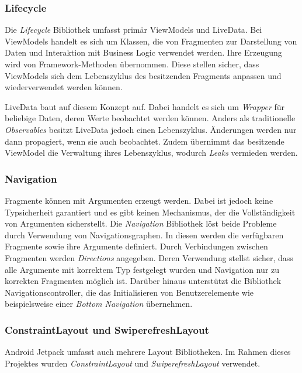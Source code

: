 \documentclass[a4paper, 11pt]{article}
\begin{document}
\subsubsection{Lifecycle}
\label{subsubsec:app:jetpack:lifecycle}
Die \textit{Lifecycle} Bibliothek umfasst primär ViewModels und LiveData.
Bei ViewModels handelt es sich um Klassen, die von Fragmenten zur Darstellung von Daten und Interaktion mit Business Logic verwendet werden.
Ihre Erzeugung wird von Framework-Methoden übernommen.
Diese stellen sicher, dass ViewModels sich dem Lebenszyklus des besitzenden Fragments anpassen und wiederverwendet werden können.

LiveData baut auf diesem Konzept auf.
Dabei handelt es sich um \textit{Wrapper} für beliebige Daten, deren Werte beobachtet werden können.
Anders als traditionelle \textit{Observables} besitzt LiveData jedoch einen Lebenszyklus.
Änderungen werden nur dann propagiert, wenn sie auch beobachtet.
Zudem übernimmt das besitzende ViewModel die Verwaltung ihres Lebenszyklus, wodurch \textit{Leaks} vermieden werden.

\subsubsection{Navigation}
\label{subsubsec:app:jetpack:navigation}
Fragmente können mit Argumenten erzeugt werden.
Dabei ist jedoch keine Typsicherheit garantiert und es gibt keinen Mechanismus, der die Vollständigkeit von Argumenten sicherstellt.
Die \textit{Navigation} Bibliothek löst beide Probleme durch Verwendung von Navigationsgraphen.
In diesen werden die verfügbaren Fragmente sowie ihre Argumente definiert.
Durch Verbindungen zwischen Fragmenten werden \textit{Directions} angegeben.
Deren Verwendung stellst sicher, dass alle Argumente mit korrektem Typ festgelegt wurden und Navigation nur zu korrekten Fragmenten möglich ist.
Darüber hinaus unterstützt die Bibliothek Navigationscontroller, die das Initialisieren von Benutzerelemente wie beispielsweise einer \textit{Bottom Navigation} übernehmen. 

\subsubsection{ConstraintLayout und SwiperefreshLayout}
\label{subsubsec:app:jetpack:layouts}
Android Jetpack umfasst auch mehrere Layout Bibliotheken.
Im Rahmen dieses Projektes wurden \textit{ConstraintLayout} und \textit{SwiperefreshLayout} verwendet.
\end{document}
